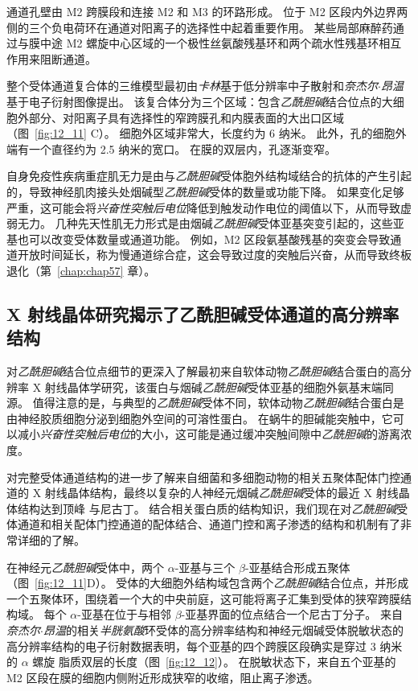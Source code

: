 通道孔壁由 M2 跨膜段和连接 M2 和 M3 的环路形成。
位于 M2 区段内外边界两侧的三个负电荷环在通道对阳离子的选择性中起着重要作用。
某些局部麻醉药通过与膜中途 M2 螺旋中心区域的一个极性丝氨酸残基环和两个疏水性残基环相互作用来阻断通道。


整个受体通道复合体的三维模型最初由\textit{卡林}基于低分辨率中子散射和\textit{奈杰尔$\cdot$昂温}基于电子衍射图像提出。
该复合体分为三个区域：包含\textit{乙酰胆碱}结合位点的大细胞外部分、对阳离子具有选择性的窄跨膜孔和内膜表面的大出口区域（图~\ref{fig:12_11} C）。
细胞外区域非常大，长度约为 6 纳米。
此外，孔的细胞外端有一个直径约为 2.5 纳米的宽口。
在膜的双层内，孔逐渐变窄。


自身免疫性疾病重症肌无力是由与\textit{乙酰胆碱}受体胞外结构域结合的抗体的产生引起的，导致神经肌肉接头处烟碱型\textit{乙酰胆碱}受体的数量或功能下降。
如果变化足够严重，这可能会将\textit{兴奋性突触后电位}降低到触发动作电位的阈值以下，从而导致虚弱无力。
几种先天性肌无力形式是由烟碱\textit{乙酰胆碱}受体亚基突变引起的，这些亚基也可以改变受体数量或通道功能。
例如，M2 区段氨基酸残基的突变会导致通道开放时间延长，称为慢通道综合症，这会导致过度的突触后兴奋，从而导致终板退化（第~\ref{chap:chap57} 章）。



\subsection{X 射线晶体研究揭示了乙酰胆碱受体通道的高分辨率结构}

对\textit{乙酰胆碱}结合位点细节的更深入了解最初来自软体动物\textit{乙酰胆碱}结合蛋白的高分辨率 X 射线晶体学研究，该蛋白与烟碱\textit{乙酰胆碱}受体亚基的细胞外氨基末端同源。
值得注意的是，与典型的\textit{乙酰胆碱}受体不同，软体动物\textit{乙酰胆碱}结合蛋白是由神经胶质细胞分泌到细胞外空间的可溶性蛋白。
在蜗牛的胆碱能突触中，它可以减小\textit{兴奋性突触后电位}的大小，这可能是通过缓冲突触间隙中\textit{乙酰胆碱}的游离浓度。


对完整受体通道结构的进一步了解来自细菌和多细胞动物的相关五聚体配体门控通道的 X 射线晶体结构，最终以复杂的人神经元烟碱\textit{乙酰胆碱}受体的最近 X 射线晶体结构达到顶峰 与尼古丁。
结合相关蛋白质的结构知识，我们现在对\textit{乙酰胆碱}受体通道和相关配体门控通道的配体结合、通道门控和离子渗透的结构和机制有了非常详细的了解。


在神经元\textit{乙酰胆碱}受体中，两个 $\alpha$-亚基与三个 $\beta$-亚基结合形成五聚体（图~\ref{fig:12_11}D）。
受体的大细胞外结构域包含两个\textit{乙酰胆碱}结合位点，并形成一个五聚体环，围绕着一个大的中央前庭，这可能将离子汇集到受体的狭窄跨膜结构域。
每个 $\alpha$-亚基在位于与相邻 $\beta$-亚基界面的位点结合一个尼古丁分子。
来自\textit{奈杰尔$\cdot$昂温}的相关\textit{半胱氨酸}环受体的高分辨率结构和神经元烟碱受体脱敏状态的高分辨率结构的电子衍射数据表明，每个亚基的四个跨膜区段确实是穿过 3 纳米的 $\alpha$ 螺旋 脂质双层的长度（图~\ref{fig:12_12}）。
在脱敏状态下，来自五个亚基的 M2 区段在膜的细胞内侧附近形成狭窄的收缩，阻止离子渗透。


